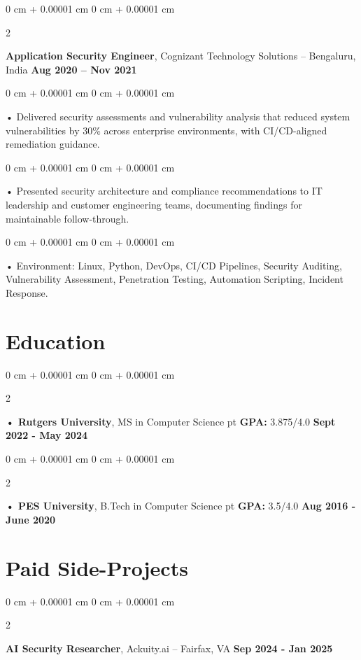 \documentclass[10pt, letterpaper]{article}
\newenvironment{onecolentry}{
    \begin{adjustwidth}{
        0 cm + 0.00001 cm
    }{
        0 cm + 0.00001 cm
    }
}{
    \end{adjustwidth}
} %
\newenvironment{twocolentry}[2][]{
    \onecolentry
    \def\secondColumn{#2}
    \setcolumnwidth{\fill, 4.5 cm}
    \begin{paracol}{2}
}{
    \switchcolumn \raggedleft \secondColumn
    \end{paracol}
    \endonecolentry
} %
\begin{document}
        \begin{twocolentry}{
            \textbf{Aug 2020 – Nov 2021}
        }
            \vspace{2 pt }
            \textbf{Application Security Engineer}, Cognizant Technology Solutions -- Bengaluru, India\end{twocolentry}
        \begin{onecolentry}
             • Delivered security assessments and vulnerability analysis that reduced system vulnerabilities by 30\% across enterprise environments, with CI/CD-aligned remediation guidance.
        \end{onecolentry}
        \begin{onecolentry}
             • Presented security architecture and compliance recommendations to IT leadership and customer engineering teams, documenting findings for maintainable follow-through.
        \end{onecolentry}
        \begin{onecolentry}
             • Environment: Linux, Python, DevOps, CI/CD Pipelines, Security Auditing, Vulnerability Assessment, Penetration Testing, Automation Scripting, Incident Response.
        \end{onecolentry}
    \vspace{2 pt }
        \section{Education}
        \vspace{2 pt }
        \begin{twocolentry}{
            \textbf{Sept 2022 - May 2024}
        }
            \textbf{ • Rutgers University}, MS in Computer Science  pt \textbf{GPA:} 3.875/4.0  \end{twocolentry}

        \begin{twocolentry}{
            \textbf{Aug 2016 - June 2020}
        }
            \textbf{ • PES University}, B.Tech in Computer Science  pt \textbf{GPA:} 3.5/4.0  \end{twocolentry}

    \vspace{0.4cm}
    \section{Paid Side-Projects}
            \vspace{2 pt }
                    \begin{twocolentry}{
            \textbf{Sep 2024 - Jan 2025}
        }
            \textbf{AI Security Researcher}, Ackuity.ai -- Fairfax, VA\end{twocolentry}
\end{document}
